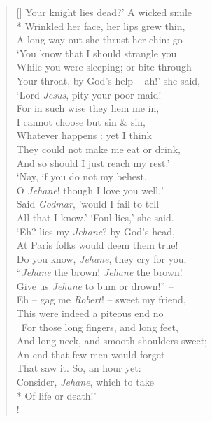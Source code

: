 \documentclass[MAIN]{subfiles}
\begin{document}
\begin{verse}[\versewidth]
{\color{white} Your knight lies dead?'} A wicked smile\\*
Wrinkled her face, her lips grew thin,\\
A long way out she thrust her chin: go\\
`You know that I should strangle you\\
While you were sleeping; or bite through\\
Your throat, by God's help -- ah!' she said,\\
`Lord \emph{Jesus}, pity your poor maid!\\
For in such wise they hem me in,\\
I cannot choose but sin \& sin,\\
Whatever happens : yet I think\\
They could not make me eat or drink,\\
And so should I just reach my rest.'\\
`Nay, if you do not my behest,\\
O \emph{Jehane}! though I love you well,'\\
Said \emph{Godmar}, 'would I fail to tell\\
All that I know.' `Foul lies,' she said.\\
`Eh? lies my \emph{Jehane}? by God's head,\\
At {\sc Paris} folks would deem them true!\\
Do you know, \emph{Jehane}, they cry for you,\\
``\emph{Jehane} the brown! \emph{Jehane} the brown!\\
Give us \emph{Jehane} to bum or drown!'' --\\ 
Eh -- gag me \emph{Robert}! -- sweet my friend,\\
This were indeed a piteous end no\\\
For those long fingers, and long feet,\\
And long neck, and smooth shoulders sweet;\\
An end that few men would forget\\
That saw it. So, an hour yet:\\
Consider, \emph{Jehane}, which to take\\*
Of life or death!'\\!


\end{verse}
\end{document}

